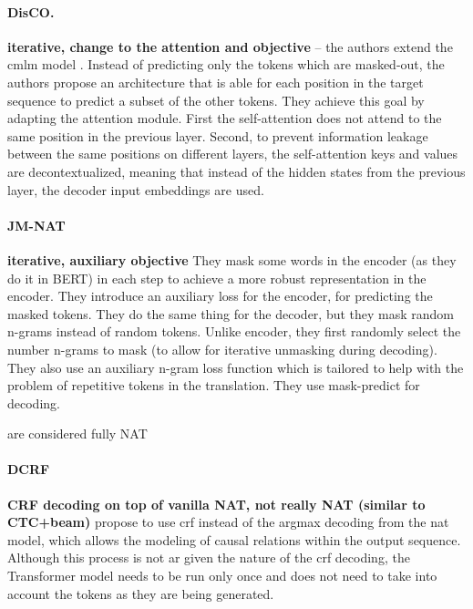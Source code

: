 \paragraph{DisCO.} \textbf{iterative, change to the attention and objective}
\citep{kasai2020nonautoregressive} -- the authors extend the \ac{cmlm} model
\citep{ghazvininejad-etal-2019-mask}. Instead of predicting only the tokens
which are masked-out, the authors propose an architecture that is able for each
position in the target sequence to predict a subset of the other tokens. They
achieve this goal by adapting the attention module. First the self-attention
does not attend to the same position in the previous layer. Second, to prevent
information leakage between the same positions on different layers, the
self-attention keys and values are decontextualized, meaning that instead of
the hidden states from the previous layer, the decoder input embeddings are
used.

\paragraph{JM-NAT} \textbf{iterative, auxiliary objective}
\citep{guo-etal-2020-jointly} They mask some words in the encoder (as they do
it in BERT) in each step to achieve a more robust representation in the
encoder. They introduce an auxiliary loss for the encoder, for predicting the
masked tokens. They do the same thing for the decoder, but they mask random
n-grams instead of random tokens. Unlike encoder, they first randomly select
the number n-grams to mask (to allow for iterative unmasking during
decoding). They also use an auxiliary n-gram loss function which is tailored to
help with the problem of repetitive tokens in the translation. They use
mask-predict \citep{ghazvininejad-etal-2019-mask} for decoding.


 are considered fully NAT

\paragraph{DCRF} \textbf{CRF decoding on top of vanilla NAT, not really NAT
  (similar to CTC+beam)} \citet{sun2019fast} propose to use \ac{crf} instead of
the argmax decoding from the \ac{nat} model, which allows the modeling of
causal relations within the output sequence. Although this process is not
\acl{ar} given the nature of the \ac{crf} decoding, the Transformer model needs
to be run only once and does not need to take into account the tokens as they
are being generated.

